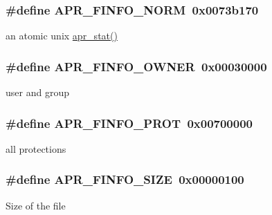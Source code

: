 \subsubsection[{\texorpdfstring{A\+P\+R\+\_\+\+F\+I\+N\+F\+O\+\_\+\+N\+O\+RM}{APR_FINFO_NORM}}]{\setlength{\rightskip}{0pt plus 5cm}\#define A\+P\+R\+\_\+\+F\+I\+N\+F\+O\+\_\+\+N\+O\+RM~0x0073b170}\hypertarget{group__apr__file__stat_gad3f64010d25d2fe926191804d7c99379}{}\label{group__apr__file__stat_gad3f64010d25d2fe926191804d7c99379}
an atomic unix \hyperlink{group__apr__file__stat_gafb0f4a4fa4545c155e20ddd8f2001c1a}{apr\+\_\+stat()} 
\subsubsection[{\texorpdfstring{A\+P\+R\+\_\+\+F\+I\+N\+F\+O\+\_\+\+O\+W\+N\+ER}{APR_FINFO_OWNER}}]{\setlength{\rightskip}{0pt plus 5cm}\#define A\+P\+R\+\_\+\+F\+I\+N\+F\+O\+\_\+\+O\+W\+N\+ER~0x00030000}\hypertarget{group__apr__file__stat_ga27dee9407b38a459c57618098c3920b0}{}\label{group__apr__file__stat_ga27dee9407b38a459c57618098c3920b0}
user and group 
\subsubsection[{\texorpdfstring{A\+P\+R\+\_\+\+F\+I\+N\+F\+O\+\_\+\+P\+R\+OT}{APR_FINFO_PROT}}]{\setlength{\rightskip}{0pt plus 5cm}\#define A\+P\+R\+\_\+\+F\+I\+N\+F\+O\+\_\+\+P\+R\+OT~0x00700000}\hypertarget{group__apr__file__stat_gad902be0636860cb3f8ad76a59abbcd7c}{}\label{group__apr__file__stat_gad902be0636860cb3f8ad76a59abbcd7c}
all protections 
\subsubsection[{\texorpdfstring{A\+P\+R\+\_\+\+F\+I\+N\+F\+O\+\_\+\+S\+I\+ZE}{APR_FINFO_SIZE}}]{\setlength{\rightskip}{0pt plus 5cm}\#define A\+P\+R\+\_\+\+F\+I\+N\+F\+O\+\_\+\+S\+I\+ZE~0x00000100}\hypertarget{group__apr__file__stat_gadf72493da450c0b1e3d279e98a973120}{}\label{group__apr__file__stat_gadf72493da450c0b1e3d279e98a973120}
Size of the file 

